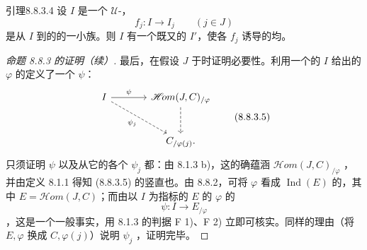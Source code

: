 \begin{SGAresult}{引理}{8.8.3.4}
设 $I$ 是一个 $\mathcal U$-，
\[
f_j:I\longrightarrow I_j\qquad(j\in J)
\]
是从 $I$ 到的的一小族。则 $I$ 有一个既又的 $I'$，使各 $f_j$ 诱导的均。
\end{SGAresult}
\begin{proof}[命题 8.8.3 的证明（续）]
最后，在假设 $J$ 于时证明必要性。利用一个的 $I$ 给出的 $\varphi$ 的定义了一个 $\psi$：
\[
\begin{tikzcd}[column sep=large,row sep=large]
I\arrow[r,"\psi"]\arrow[dr,dashed,"\psi_j"']&
\mathscr{H}\!om(J,C)_{/\varphi}\arrow[d,dashed]\\
&C_{/\varphi(j)}.
\end{tikzcd}\tag{8.8.3.5}
\]
只须证明 $\psi$ 以及从它的各个 $\psi_j$ 都：由 8.1.3 b)，这的确蕴涵 $\mathscr{H}\!om(J,C)_{/\varphi}$ ，并由定义 8.1.1 得知 (8.8.3.5) 的竖直也。由 8.8.2，可将 $\varphi$ 看成 $\operatorname{Ind}(E)$ 的，其中 $E=\mathscr{H}\!om(J,C)$；而由以 $I$ 为指标的 $E$ 的 $\varphi$ 的
\[
\psi:I\longrightarrow E_{/\varphi}
\]
，这是一个一般事实，用 8.1.3 的判据 F 1)、F 2) 立即可核实。同样的理由（将 $E,\varphi$ 换成 $C,\varphi(j)$）说明 $\psi_j$ ，证明完毕。
\end{proof}

